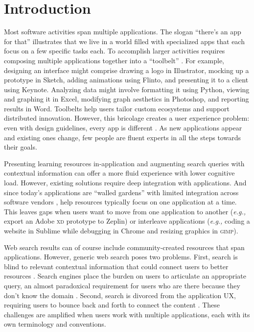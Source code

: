 \section{Introduction}
Most software activities span multiple applications. The slogan ``there's an app for that'' illustrates that we live in a world filled with specialized apps that each focus on a few specific tasks each. To accomplish larger activities requires composing multiple applications together into a ``toolbelt'' \cite{Sumner1997}. For example, designing an interface might comprise drawing a logo in Illustrator, mocking up a prototype in Sketch, adding animations using Flinto, and presenting it to a client using Keynote. Analyzing data might involve formatting it using Python, viewing and graphing it in Excel, modifying graph aesthetics in Photoshop, and reporting results in Word. Toolbelts help users tailor custom ecosystems and support distributed innovation. However, this bricolage creates a user experience problem: even with design guidelines, every app is different \cite{Beaudouin-Lafon2018}. As new applications appear and existing ones change, few people are fluent experts in all the steps towards their goals.

Presenting learning resources in-application \cite{Grossman2010a, Chilana2012, Matejka2011a, Matejka2011, Brandt2010, Ichinco2017} and augmenting search queries with contextual information \cite{Ekstrand2011, Brandt2010} can offer a more fluid experience with lower cognitive load. However, existing solutions require deep integration with applications. And since today's applications are ``walled gardens''  with limited integration across software vendors \cite{Beaudouin-Lafon2018}, help resources typically focus on one application at a time. This leaves gaps when users want to move from one application to another (\textit{e.g.,} export an Adobe \textsc{xd} prototype to Zeplin) or interleave applications (\textit{e.g.,} coding a website in Sublime while debugging in Chrome and resizing graphics in \textsc{gimp}). 

Web search results can of course include community-created resources that span applications. However, generic web search poses two problems. First, search is blind to relevant contextual information that could connect users to better resources \cite{Ekstrand2011, Kraft2005, Finkelstein2002}. Search engines place the burden on users to articulate an appropriate query, an almost paradoxical requirement for users who are there because they don't know the domain \cite{Russell2011}.  Second, search is divorced from the application UX, requiring users to bounce back and forth to connect the content \cite{Fourney2014Intertwine}. These challenges are amplified when users work with multiple applications, each with its own terminology and conventions.

